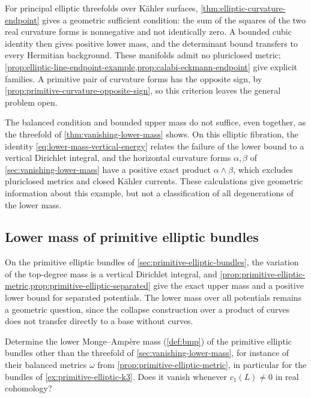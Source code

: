 For principal elliptic threefolds over K\"ahler surfaces, \cref{thm:elliptic-curvature-endpoint} gives a geometric sufficient condition: the sum of the squares of the two real curvature forms is nonnegative and not identically zero. A bounded cubic identity then gives positive lower mass, and the determinant bound transfers to every Hermitian background. These manifolds admit no pluriclosed metric; \cref{prop:elliptic-line-endpoint-example,prop:calabi-eckmann-endpoint} give explicit families. A primitive pair of curvature forms has the opposite sign, by \cref{prop:primitive-curvature-opposite-sign}, so this criterion leaves the general problem open.

The balanced condition and bounded upper mass do not suffice, even together, as the threefold of \cref{thm:vanishing-lower-mass} shows. On this elliptic fibration, the identity \eqref{eq:lower-mass-vertical-energy} relates the failure of the lower bound to a vertical Dirichlet integral, and the horizontal curvature forms $\alpha,\beta$ of \cref{sec:vanishing-lower-mass} have a positive exact product $\alpha\wedge\beta$, which excludes pluriclosed metrics and closed K\"ahler currents. These calculations give geometric information about this example, but not a classification of all degenerations of the lower mass.

\subsection{Lower mass of primitive elliptic bundles}
\label{sec:primitive-elliptic-lower-mass}

On the primitive elliptic bundles of \cref{sec:primitive-elliptic-bundles}, the variation of the top-degree mass is a vertical Dirichlet integral, and \cref{prop:primitive-elliptic-metric,prop:primitive-elliptic-separated} give the exact upper mass and a positive lower bound for separated potentials. The lower mass over all potentials remains a geometric question, since the collapse construction over a product of curves does not transfer directly to a base without curves.

\begin{problem}\label{prob:primitive-elliptic-lower-mass}
Determine the lower Monge--Amp\`ere mass (\cref{def:bmp}) of the primitive elliptic bundles other than the threefold of \cref{sec:vanishing-lower-mass}, for instance of their balanced metrics $\omega$ from \cref{prop:primitive-elliptic-metric}, in particular for the bundles of \cref{ex:primitive-elliptic-k3}. Does it vanish whenever $c_1(L)\neq0$ in real cohomology?
\end{problem}


